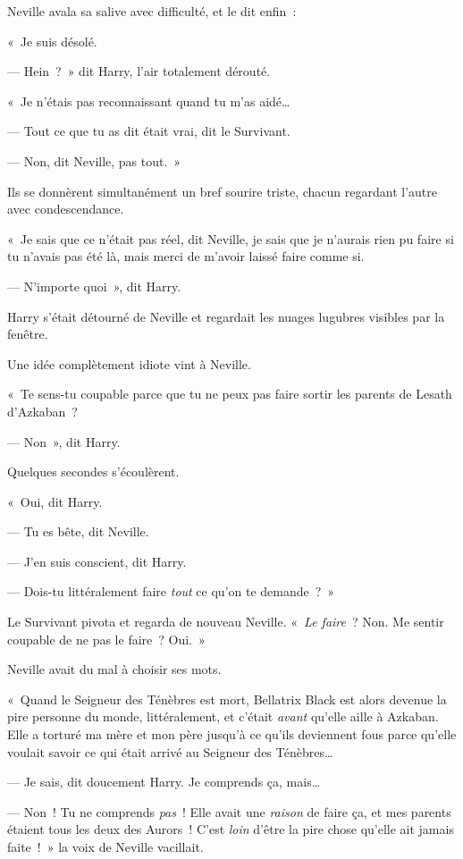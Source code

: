Neville avala sa salive avec difficulté, et le dit enfin~:

«~Je suis désolé.

--- Hein~?~»
dit Harry, l'air totalement dérouté.

«~Je n'étais pas reconnaissant quand tu m'as aidé…

--- Tout ce que tu as dit était vrai, dit le Survivant.

--- Non, dit Neville, pas tout.~»

Ils se donnèrent simultanément un bref sourire triste, chacun regardant l'autre avec condescendance.

«~Je sais que ce n'était pas réel, dit Neville, je sais que je n'aurais rien pu faire si tu n'avais pas été là, mais merci de m'avoir laissé faire comme si.

--- N'importe quoi~», dit Harry.

Harry s'était détourné de Neville et regardait les nuages lugubres visibles par la fenêtre.

Une idée complètement idiote vint à Neville.

«~Te sens-tu coupable parce que tu ne peux pas faire sortir les parents de Lesath d'Azkaban~?

--- Non~», dit Harry.

Quelques secondes s'écoulèrent.

«~Oui, dit Harry.

--- Tu es bête, dit Neville.

--- J'en suis conscient, dit Harry.

--- Dois-tu littéralement faire \emph{tout} ce qu'on te demande~?~»

Le Survivant pivota et regarda de nouveau Neville.
«~\emph{Le faire}~?
Non. Me sentir coupable de ne pas le faire~?
Oui.~»

Neville avait du mal à choisir ses mots.

«~Quand le Seigneur des Ténèbres est mort, Bellatrix Black est alors devenue la pire personne du monde, littéralement, et c'était \emph{avant} qu'elle aille à Azkaban.
Elle a torturé ma mère et mon père jusqu'à ce qu'ils deviennent fous parce qu'elle voulait savoir ce qui était arrivé au Seigneur des Ténèbres…

--- Je sais, dit doucement Harry.
Je comprends ça, mais…

--- Non~!
Tu ne comprends \emph{pas}~!
Elle avait une \emph{raison} de faire ça, et mes parents étaient tous les deux des Aurors~!
C'est \emph{loin} d'être la pire chose qu'elle ait jamais faite~!~»
la voix de Neville vacillait.

